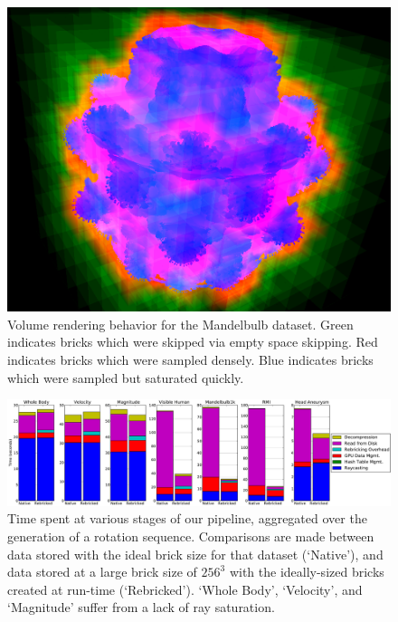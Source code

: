 \begin{figure}[t]
  \centering
  \includegraphics[width=0.95\linewidth]{images/rg/terminate-empty.png}
  \caption{Volume rendering behavior for the Mandelbulb dataset.
  Green indicates bricks which were skipped via empty space skipping.
  Red indicates bricks which were sampled densely.  Blue indicates
  bricks which were sampled but saturated quickly.
  }
  \label{fig:bricks-empty}
\end{figure}

\begin{figure}
  \centering
  \includegraphics[width=1.00\linewidth]{images/rg/breakdown.pdf}

  \caption{Time spent at various stages of our pipeline, aggregated
  over the generation of a rotation sequence.  Comparisons are made
  between data stored with the ideal brick size for that dataset
  (`Native'), and data stored at a large brick size of $256^3$ with
  the ideally-sized bricks created at run-time (`Rebricked').  `Whole
  Body', `Velocity', and `Magnitude' suffer from a lack of ray
  saturation.}

  \label{fig:breakdown}
\end{figure}

